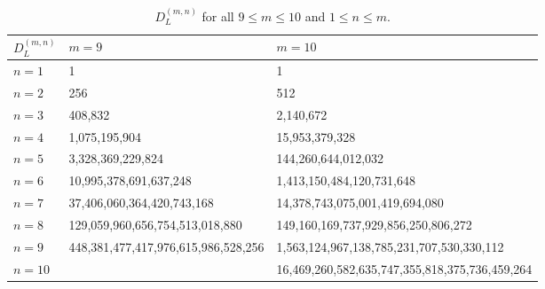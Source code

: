 \documentclass{article}
\begin{document}
\begin{table}
\begin{center}
\begin{tabular}{|l|l|l|}
\hline
$D_L^{(m,n)}$ & $m=9$                                 & $m=10$                                                         \\ \hline
$n=1$          & 1                                   & 1                                                                                                      \\ \hline
$n=2$         & 256                                 & 512                                                          \\ \hline
$n=3$         &  408,832                             & 2,140,672                                                   \\ \hline
$n=4$                             & 1,075,195,904                       & 15,953,379,328\\ \hline
$n=5$                     & 3,328,369,229,824                   & 144,260,644,012,032\\ \hline
$n=6$       & 10,995,378,691,637,248              & 1,413,150,484,120,731,648                                  \\ \hline
$n=7$       & 37,406,060,364,420,743,168          & 14,378,743,075,001,419,694,080                             \\ \hline
$n=8$   & 129,059,960,656,754,513,018,880     & 149,160,169,737,929,856,250,806,272                     \\ \hline
$n=9$     & 448,381,477,417,976,615,986,528,256 & 1,563,124,967,138,785,231,707,530,330,112                  \\ \hline
$n=10$   &     & 16,469,260,582,635,747,355,818,375,736,459,264       \\ \hline
\end{tabular}
    \caption{$D_L^{(m,n)}$ for all $9\leq m\leq 10$ and $1\leq n\leq m$.}
    \label{tab:mosaic-counts-3}
\end{center}
\end{table}

\pagebreak
\end{document}
